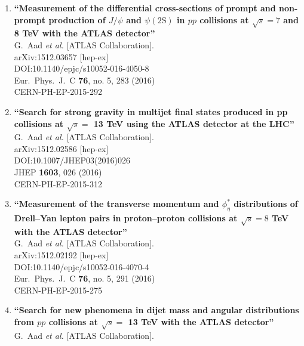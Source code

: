 \documentclass{article}
\begin{document}
\begin{enumerate}
\item%
{\bf ``Measurement of the differential cross-sections of prompt and non-prompt production of $J/\psi $ and $\psi (2\mathrm {S})$ in $pp$ collisions at $\sqrt{s} = 7$ and 8 TeV with the ATLAS detector''}
  \\{}G.~Aad {\it et al.} [ATLAS Collaboration].
  \\{}arXiv:1512.03657 [hep-ex]
  \\{}DOI:10.1140/epjc/s10052-016-4050-8
  \\{}Eur.\ Phys.\ J.\ C {\bf 76}, no. 5, 283 (2016)
  \\{}CERN-PH-EP-2015-292
\item%
{\bf ``Search for strong gravity in multijet final states produced in pp collisions at $\sqrt{s} =$ 13 TeV using the ATLAS detector at the LHC''}
  \\{}G.~Aad {\it et al.} [ATLAS Collaboration].
  \\{}arXiv:1512.02586 [hep-ex]
  \\{}DOI:10.1007/JHEP03(2016)026
  \\{}JHEP {\bf 1603}, 026 (2016)
  \\{}CERN-PH-EP-2015-312
\item%
{\bf ``Measurement of the transverse momentum and $\phi ^*_{\eta }$ distributions of Drell–Yan lepton pairs in proton–proton collisions at $\sqrt{s}=8$  TeV with the ATLAS detector''}
  \\{}G.~Aad {\it et al.} [ATLAS Collaboration].
  \\{}arXiv:1512.02192 [hep-ex]
  \\{}DOI:10.1140/epjc/s10052-016-4070-4
  \\{}Eur.\ Phys.\ J.\ C {\bf 76}, no. 5, 291 (2016)
  \\{}CERN-PH-EP-2015-275
\item%
{\bf ``Search for new phenomena in dijet mass and angular distributions from $pp$ collisions at $\sqrt{s}=$ 13 TeV with the ATLAS detector''}
  \\{}G.~Aad {\it et al.} [ATLAS Collaboration].

\end{enumerate}
\end{document}

